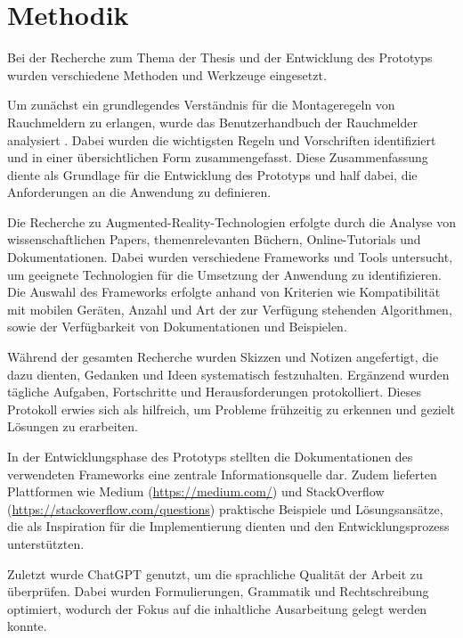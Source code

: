 \chapter{Methodik}

Bei der Recherche zum Thema der Thesis und der Entwicklung des Prototyps wurden verschiedene Methoden und Werkzeuge eingesetzt.

Um zunächst ein grundlegendes Verständnis für die Montageregeln von Rauchmeldern zu erlangen, wurde das Benutzerhandbuch der Rauchmelder analysiert \cite{brunata2023handbuch}. Dabei wurden die wichtigsten Regeln und Vorschriften identifiziert und in einer übersichtlichen Form zusammengefasst. Diese Zusammenfassung diente als Grundlage für die Entwicklung des Prototyps und half dabei, die Anforderungen an die Anwendung zu definieren.

Die Recherche zu Augmented-Reality-Technologien erfolgte durch die Analyse von wissenschaftlichen Papers, themenrelevanten Büchern, Online-Tutorials und Dokumentationen. Dabei wurden verschiedene Frameworks und Tools untersucht, um geeignete Technologien für die Umsetzung der Anwendung zu identifizieren. Die Auswahl des Frameworks erfolgte anhand von Kriterien wie Kompatibilität mit mobilen Geräten, Anzahl und Art der zur Verfügung stehenden Algorithmen, sowie der Verfügbarkeit von Dokumentationen und Beispielen.

Während der gesamten Recherche wurden Skizzen und Notizen angefertigt, die dazu dienten, Gedanken und Ideen systematisch festzuhalten. Ergänzend wurden tägliche Aufgaben, Fortschritte und Herausforderungen protokolliert. Dieses Protokoll erwies sich als hilfreich, um Probleme frühzeitig zu erkennen und gezielt Lösungen zu erarbeiten.

In der Entwicklungsphase des Prototyps stellten die Dokumentationen des verwendeten Frameworks eine zentrale Informationsquelle dar. Zudem lieferten Plattformen wie Medium (\url{https://medium.com/}) und StackOverflow (\url{https://stackoverflow.com/questions}) praktische Beispiele und Lösungsansätze, die als Inspiration für die Implementierung dienten und den Entwicklungsprozess unterstützten.

Zuletzt wurde ChatGPT genutzt, um die sprachliche Qualität der Arbeit zu überprüfen. Dabei wurden Formulierungen, Grammatik und Rechtschreibung optimiert, wodurch der Fokus auf die inhaltliche Ausarbeitung gelegt werden konnte.
